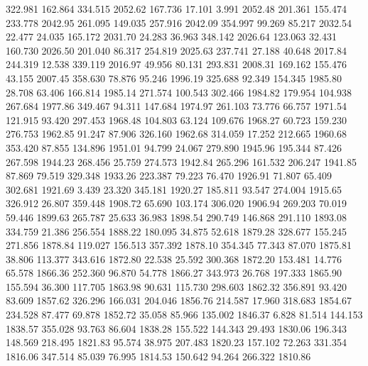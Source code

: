  322.981  162.864  334.515      2052.62
 167.736   17.101    3.991      2052.48
 201.361  155.474  233.778      2042.95
 261.095  149.035  257.916      2042.09
 354.997   99.269   85.217      2032.54
  22.477   24.035  165.172      2031.70
  24.283   36.963  348.142      2026.64
 123.063   32.431  160.730      2026.50
 201.040   86.317  254.819      2025.63
 237.741   27.188   40.648      2017.84
 244.319   12.538  339.119      2016.97
  49.956   80.131  293.831      2008.31
 169.162  155.476   43.155      2007.45
 358.630   78.876   95.246      1996.19
 325.688   92.349  154.345      1985.80
  28.708   63.406  166.814      1985.14
 271.574  100.543  302.466      1984.82
 179.954  104.938  267.684      1977.86
 349.467   94.311  147.684      1974.97
 261.103   73.776   66.757      1971.54
 121.915   93.420  297.453      1968.48
 104.803   63.124  109.676      1968.27
  60.723  159.230  276.753      1962.85
  91.247   87.906  326.160      1962.68
 314.059   17.252  212.665      1960.68
 353.420   87.855  134.896      1951.01
  94.799   24.067  279.890      1945.96
 195.344   87.426  267.598      1944.23
 268.456   25.759  274.573      1942.84
 265.296  161.532  206.247      1941.85
  87.869   79.519  329.348      1933.26
 223.387   79.223   76.470      1926.91
  71.807   65.409  302.681      1921.69
   3.439   23.320  345.181      1920.27
 185.811   93.547  274.004      1915.65
 326.912   26.807  359.448      1908.72
  65.690  103.174  306.020      1906.94
 269.203   70.019   59.446      1899.63
 265.787   25.633   36.983      1898.54
 290.749  146.868  291.110      1893.08
 334.759   21.386  256.554      1888.22
 180.095   34.875   52.618      1879.28
 328.677  155.245  271.856      1878.84
 119.027  156.513  357.392      1878.10
 354.345   77.343   87.070      1875.81
  38.806  113.377  343.616      1872.80
  22.538   25.592  300.368      1872.20
 153.481   14.776   65.578      1866.36
 252.360   96.870   54.778      1866.27
 343.973   26.768  197.333      1865.90
 155.594   36.300  117.705      1863.98
  90.631  115.730  298.603      1862.32
 356.891   93.420   83.609      1857.62
 326.296  166.031  204.046      1856.76
 214.587   17.960  318.683      1854.67
 234.528   87.477   69.878      1852.72
  35.058   85.966  135.002      1846.37
   6.828   81.514  144.153      1838.57
 355.028   93.763   86.604      1838.28
 155.522  144.343   29.493      1830.06
 196.343  148.569  218.495      1821.83
  95.574   38.975  207.483      1820.23
 157.102   72.263  331.354      1816.06
 347.514   85.039   76.995      1814.53
 150.642   94.264  266.322      1810.86
